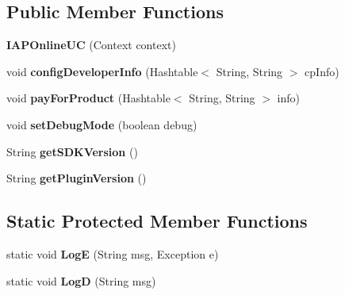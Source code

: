 \subsection*{Public Member Functions}
\begin{DoxyCompactItemize}
\item 
\mbox{\label{classorg_1_1cocos2dx_1_1plugin_1_1IAPOnlineUC_a487feec2528a5cb31c65926cbb80a0d6}} 
{\bfseries I\+A\+P\+Online\+UC} (Context context)
\item 
\mbox{\label{classorg_1_1cocos2dx_1_1plugin_1_1IAPOnlineUC_ac1f2ab09601b62ffde16b64c92cd6ae3}} 
void {\bfseries config\+Developer\+Info} (Hashtable$<$ String, String $>$ cp\+Info)
\item 
\mbox{\label{classorg_1_1cocos2dx_1_1plugin_1_1IAPOnlineUC_ad1a6abeb381519fff3d2ab9385ad224c}} 
void {\bfseries pay\+For\+Product} (Hashtable$<$ String, String $>$ info)
\item 
\mbox{\label{classorg_1_1cocos2dx_1_1plugin_1_1IAPOnlineUC_aa21c597961724101d5277a563ab858e0}} 
void {\bfseries set\+Debug\+Mode} (boolean debug)
\item 
\mbox{\label{classorg_1_1cocos2dx_1_1plugin_1_1IAPOnlineUC_a5a969c5d5a13d6ec255e000da857e57e}} 
String {\bfseries get\+S\+D\+K\+Version} ()
\item 
\mbox{\label{classorg_1_1cocos2dx_1_1plugin_1_1IAPOnlineUC_a79d89215698d62e24617a167084b81e6}} 
String {\bfseries get\+Plugin\+Version} ()
\end{DoxyCompactItemize}
\subsection*{Static Protected Member Functions}
\begin{DoxyCompactItemize}
\item 
\mbox{\label{classorg_1_1cocos2dx_1_1plugin_1_1IAPOnlineUC_ab3d6cd2ce3bc507053f17b2e375d96a9}} 
static void {\bfseries LogE} (String msg, Exception e)
\item 
\mbox{\label{classorg_1_1cocos2dx_1_1plugin_1_1IAPOnlineUC_ab71a9ef925f3ad61ac93efc6284101b4}} 
static void {\bfseries LogD} (String msg)
\end{DoxyCompactItemize}
